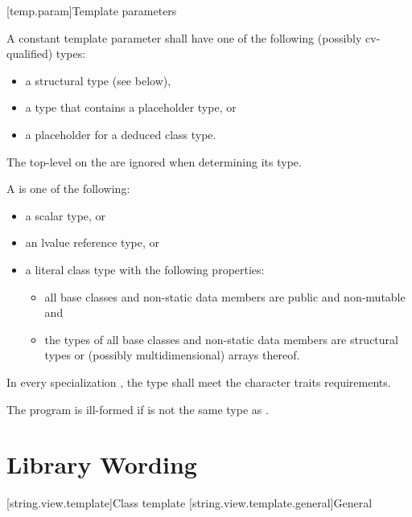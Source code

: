 \documentclass{wg21}
\begin{document}
[temp.param]{Template parameters}

\pnum
A constant template parameter
shall have one of the following (possibly cv-qualified) types:
\begin{itemize}
    \item a structural type (see below),
    \item a type that contains a placeholder type, or
    \item a placeholder for a deduced class type.
\end{itemize}
The top-level
on the
are ignored when determining its type.

\pnum
\label{term.structural.type}%
A  is one of the following:
\begin{itemize}
\item a scalar type, or
\item an lvalue reference type, or
\item a literal class type with the following properties:
\begin{itemize}
    \item
    all base classes and non-static data members are public and non-mutable and
    \item
    the types of all base classes and non-static data members are
    structural types or (possibly multidimensional) arrays thereof.
\end{itemize}
\end{itemize}

\pnum
In every specialization , the type  shall meet the character traits requirements.
\begin{note}
    The program is ill-formed if  is not the same type as .
\end{note}

\section{Library Wording}

[string.view.template]{Class template }
[string.view.template.general]{General}
\end{document}
